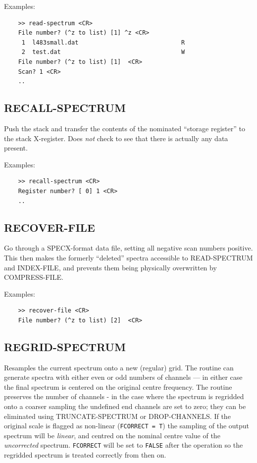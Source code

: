 \documentclass[11pt,twoside]{report}
\begin{document}
Examples:
\begin{verbatim}
    >> read-spectrum <CR>
    File number? (^z to list) [1] ^z <CR>
     1  l483small.dat                             R
     2  test.dat                                  W
    File number? (^z to list) [1]  <CR>
    Scan? 1 <CR>
    ..
\end{verbatim}

\subsection{RECALL-SPECTRUM} 

Push the stack and transfer the contents of the nominated ``storage register''
to the stack X-register. Does {\em not} check to see that there is actually
any data present.

Examples:
\begin{verbatim}
    >> recall-spectrum <CR>
    Register number? [ 0] 1 <CR>
    ..
\end{verbatim}

\subsection{RECOVER-FILE} 

Go through a  SPECX-format data file, setting all negative scan numbers
positive. This then makes the formerly ``deleted'' spectra accessible to
READ-SPECTRUM and INDEX-FILE, and prevents them being physically overwritten
by COMPRESS-FILE.  

Examples:
\begin{verbatim}
    >> recover-file <CR>
    File number? (^z to list) [2]  <CR>
\end{verbatim}

\subsection{REGRID-SPECTRUM} 

Resamples  the current spectrum onto a new (regular)
grid. The routine can generate spectra with either even or odd numbers of
channels --- in either case the final spectrum is centered on the original
centre frequency. The routine preserves the number of channels - in the case
where the spectrum is regridded onto a coarser sampling the undefined end
channels are set to zero; they can be eliminated using TRUNCATE-SPECTRUM or
DROP-CHANNELS.   If the original
scale is flagged as non-linear (\verb+FCORRECT = T+) 
the sampling of the output spectrum will be {\em linear}, and centred on the
nominal centre value of the {\em uncorrected} spectrum. \verb+FCORRECT+ will be
set to \verb+FALSE+ after the operation so the regridded spectrum is treated
correctly from then on.
\end{document}
